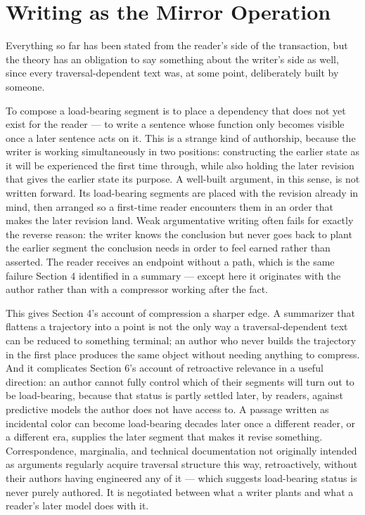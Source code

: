 \documentclass[11pt]{article}
\begin{document}
\section{Writing as the Mirror Operation}

Everything so far has been stated from the reader's side of the transaction, but the theory has an obligation to say something about the writer's side as well, since every traversal-dependent text was, at some point, deliberately built by someone.

To compose a load-bearing segment is to place a dependency that does not yet exist for the reader --- to write a sentence whose function only becomes visible once a later sentence acts on it. This is a strange kind of authorship, because the writer is working simultaneously in two positions: constructing the earlier state as it will be experienced the first time through, while also holding the later revision that gives the earlier state its purpose. A well-built argument, in this sense, is not written forward. Its load-bearing segments are placed with the revision already in mind, then arranged so a first-time reader encounters them in an order that makes the later revision land. Weak argumentative writing often fails for exactly the reverse reason: the writer knows the conclusion but never goes back to plant the earlier segment the conclusion needs in order to feel earned rather than asserted. The reader receives an endpoint without a path, which is the same failure Section 4 identified in a summary --- except here it originates with the author rather than with a compressor working after the fact.

This gives Section 4's account of compression a sharper edge. A summarizer that flattens a trajectory into a point is not the only way a traversal-dependent text can be reduced to something terminal; an author who never builds the trajectory in the first place produces the same object without needing anything to compress. And it complicates Section 6's account of retroactive relevance in a useful direction: an author cannot fully control which of their segments will turn out to be load-bearing, because that status is partly settled later, by readers, against predictive models the author does not have access to. A passage written as incidental color can become load-bearing decades later once a different reader, or a different era, supplies the later segment that makes it revise something. Correspondence, marginalia, and technical documentation not originally intended as arguments regularly acquire traversal structure this way, retroactively, without their authors having engineered any of it --- which suggests load-bearing status is never purely authored. It is negotiated between what a writer plants and what a reader's later model does with it.
\end{document}

